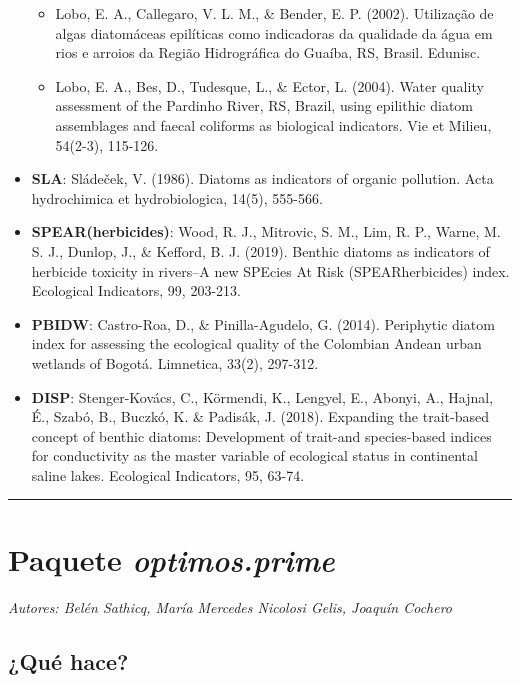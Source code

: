 \documentclass[
]{book}
\begin{document}
\begin{itemize}
  \begin{itemize}
  \item
    Lobo, E. A., Callegaro, V. L. M., \& Bender, E. P. (2002). Utilização de algas diatomáceas epilíticas como indicadoras da qualidade da água em rios e arroios da Região Hidrográfica do Guaíba, RS, Brasil. Edunisc.
  \item
    Lobo, E. A., Bes, D., Tudesque, L., \& Ector, L. (2004). Water quality assessment of the Pardinho River, RS, Brazil, using epilithic diatom assemblages and faecal coliforms as biological indicators. Vie et Milieu, 54(2-3), 115-126.
  \end{itemize}
\item
  \textbf{SLA}: Sládeček, V. (1986). Diatoms as indicators of organic pollution. Acta hydrochimica et hydrobiologica, 14(5), 555-566.
\item
  \textbf{SPEAR(herbicides)}: Wood, R. J., Mitrovic, S. M., Lim, R. P., Warne, M. S. J., Dunlop, J., \& Kefford, B. J. (2019). Benthic diatoms as indicators of herbicide toxicity in rivers--A new SPEcies At Risk (SPEARherbicides) index. Ecological Indicators, 99, 203-213.
\item
  \textbf{PBIDW}: Castro-Roa, D., \& Pinilla-Agudelo, G. (2014). Periphytic diatom index for assessing the ecological quality of the Colombian Andean urban wetlands of Bogotá. Limnetica, 33(2), 297-312.
\item
  \textbf{DISP}: Stenger-Kovács, C., Körmendi, K., Lengyel, E., Abonyi, A., Hajnal, É., Szabó, B., Buczkó, K. \& Padisák, J. (2018). Expanding the trait-based concept of benthic diatoms: Development of trait-and species-based indices for conductivity as the master variable of ecological status in continental saline lakes. Ecological Indicators, 95, 63-74.
\end{itemize}

\begin{center}\rule{0.5\linewidth}{0.5pt}\end{center}

\hypertarget{paquete-optimos.prime}{%
\section{\texorpdfstring{Paquete \emph{optimos.prime}}{Paquete optimos.prime}}\label{paquete-optimos.prime}}

\emph{Autores: Belén Sathicq, María Mercedes Nicolosi Gelis, Joaquín Cochero}

\hypertarget{quuxe9-hace-1}{%
\subsection{¿Qué hace?}\label{quuxe9-hace-1}}
\end{document}
